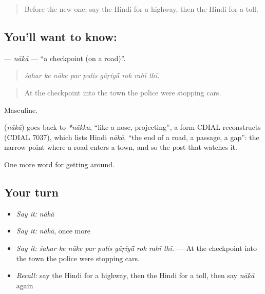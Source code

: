 \begin{quote}
Before the new one: say the Hindi for a highway, then the Hindi for a toll.
\end{quote}

\subsection*{You'll want to know: }
\textbf{} — \emph{nākā} — \textquotedblleft{}a checkpoint (on a road)\textquotedblright{}.

\begin{quote}
        
\end{quote}

\begin{quote}
\emph{śahar ke nāke par pulis gāṛiyā̃ rok rahī thī.}
\end{quote}

\begin{quote}
At the checkpoint into the town the police were stopping cars.
\end{quote}

Masculine.

\begin{cousinweb}
\textbf{} (\emph{nākā}) goes back to \emph{*nākka}, \textquotedblleft{}like a nose, projecting\textquotedblright{}, a form CDIAL reconstructs (CDIAL 7037), which lists Hindi \emph{nākā}, \textquotedblleft{}the end of a road, a passage, a gap\textquotedblright{}: the narrow point where a road enters a town, and so the post that watches it.
\end{cousinweb}

\begin{grammarlens}[title={What you've built}]
One more word for getting around.
\end{grammarlens}

\subsection*{Your turn}
\begin{itemize}
\raggedright
  \item \emph{Say it:} \emph{nākā}
  \item \emph{Say it:} \emph{nākā}, once more
  \item \emph{Say it:} \emph{śahar ke nāke par pulis gāṛiyā̃ rok rahī thī.} — At the checkpoint into the town the police were stopping cars.
  \item \emph{Recall:} say the Hindi for a highway, then the Hindi for a toll, then say \emph{nākā} again
\end{itemize}

